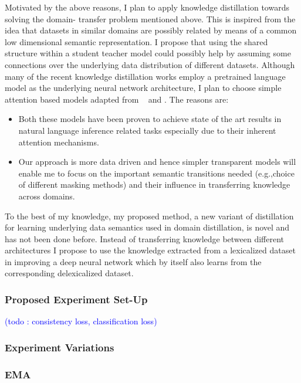 \documentclass{article}
\newcommand\todo[1]{\textcolor{blue}{(todo : #1)}}
\begin{document}
Motivated by the above reasons, I plan to apply knowledge distillation towards solving the domain- transfer problem mentioned above. This is inspired from the idea that datasets in similar domains are possibly related by means of a common low dimensional semantic representation. I propose that using the shared structure within a student teacher model could possibly help by assuming some connections over the underlying data distribution of different datasets. Although many of the recent knowledge distillation works \citep*{jiao2019tinybert,tang2019distilling,zhao2019extreme}  employ a  pretrained language model as the underlying neural network architecture, I plan to choose simple attention based models adapted from ~\citep*{parikh2016decomposable} and \citep*{chen2016enhanced}. The reasons are:

\begin{itemize}
  \item Both these models have been proven to achieve state of the art results in natural language inference related tasks especially due to their inherent attention mechanisms.
  \item Our approach is more data driven and hence simpler transparent models will enable me to focus on the important semantic transitions needed (e.g.,choice of different masking methods) and their influence in transferring knowledge across domains.
 \end{itemize}

To the best of my knowledge, my proposed method, a new variant of distillation for learning underlying data semantics used in domain distillation, is novel and has not been done before. Instead of transferring knowledge between different architectures I propose to use the knowledge extracted from a lexicalized dataset in improving a deep neural network which by itself also learns from the corresponding delexicalized dataset.

\subsubsection{Proposed Experiment Set-Up}
\todo{consistency loss, classification loss}

\subsubsection{Experiment Variations}

\subsubsection{EMA}
\end{document}
